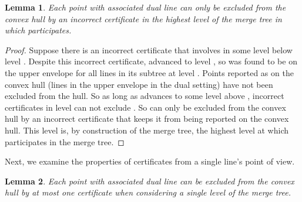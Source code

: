 \documentclass[11pt]{article}
\newtheorem{lemma}{\textbf{Lemma}}[section]
\begin{document}
\begin{lemma}
\label{lem:highest_level}
Each point  with associated dual line  can only be excluded from the convex hull by an incorrect certificate in the highest level  of the merge tree in which  participates.
\end{lemma}

\begin{proof}
   Suppose there is an incorrect certificate that involves  in some level  below level .  Despite this incorrect certificate,  advanced to level , so  was found to be on the upper envelope for all lines in its subtree at level .  Points reported as on the convex hull (lines in the upper envelope in the dual setting) have not been excluded from the hull.  So as long as  advances to some level above , incorrect certificates in level  can not exclude .  So  can only be excluded from the convex hull by an incorrect certificate that keeps it from being reported on the convex hull.  This level is, by construction of the merge tree, the highest level at which  participates in the merge tree.
\end{proof}

Next, we examine the properties of certificates from a single line's point of view.

\begin{lemma}
\label{lem:one_cert}
Each point  with associated dual line  can be excluded from the convex hull by at most one certificate when considering a single level  of the merge tree.
\end{lemma}
\end{document}
